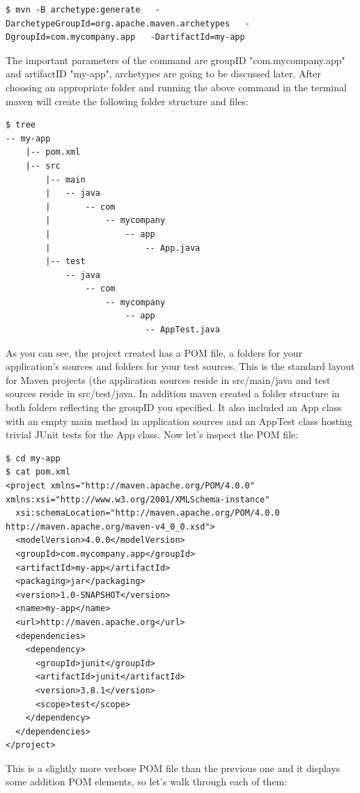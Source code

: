 \documentclass{article}
\begin{document}
\begin{lstlisting}
$ mvn -B archetype:generate   -DarchetypeGroupId=org.apache.maven.archetypes   -DgroupId=com.mycompany.app   -DartifactId=my-app
\end{lstlisting}

The  important parameters of the command are groupID "com.mycompany.app" and
artifactID "my-app", archetypes are going to be discussed later. After
choosing an appropriate folder and running the above command in the
terminal maven will create the following folder structure and files: 

\begin{lstlisting}
$ tree
-- my-app
    |-- pom.xml
    |-- src
        |-- main
        |   -- java
        |       -- com
        |           -- mycompany
        |               -- app
        |                   -- App.java
        |-- test
            -- java
                -- com
                    -- mycompany
                        -- app
                            -- AppTest.java
\end{lstlisting}

As you can see, the project created has a POM file, a
folders for your application's sources and folders for your
test sources. This is the standard layout for Maven projects (the
application sources reside in src/main/java and test
sources reside in src/test/java.
In addition maven created a folder structure in both folders
reflecting the groupID you specified. It also included an App class
with an empty main method in application sources and an AppTest class
hosting trivial JUnit tests for the App class. Now let's inspect the
POM file:

\begin{lstlisting}
$ cd my-app
$ cat pom.xml
<project xmlns="http://maven.apache.org/POM/4.0.0" xmlns:xsi="http://www.w3.org/2001/XMLSchema-instance"
  xsi:schemaLocation="http://maven.apache.org/POM/4.0.0 http://maven.apache.org/maven-v4_0_0.xsd">
  <modelVersion>4.0.0</modelVersion>
  <groupId>com.mycompany.app</groupId>
  <artifactId>my-app</artifactId>
  <packaging>jar</packaging>
  <version>1.0-SNAPSHOT</version>
  <name>my-app</name>
  <url>http://maven.apache.org</url>
  <dependencies>
    <dependency>
      <groupId>junit</groupId>
      <artifactId>junit</artifactId>
      <version>3.8.1</version>
      <scope>test</scope>
    </dependency>
  </dependencies>
</project>
\end{lstlisting}

This is a slightly more verbose POM file than the previous one and it
displays some addition POM elements, so let's walk through each of them:
\end{document}
